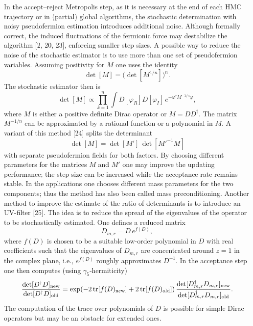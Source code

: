 In the accept--reject Metropolis step, as it is necessary at the end of each
HMC trajectory or in (partial) global algorithms, the stochastic determination
with noisy pseudofermion estimation introduces additional noise. Although
formally correct, the induced fluctuations of the fermionic force may
destabilize the algorithm [2, 20, 23], enforcing smaller step sizes.
A possible way to reduce the noise of the stochastic estimator is to use more
than one set of pseudofermion variables. Assuming positivity for $M$ one uses
the identity
\begin{equation}
\det[M] = \Big(\det[M^{1/n}]\Big)^n.
\end{equation}
The stochastic estimator then is
\begin{equation}
\det[M] \propto \prod_{k=1}^{n}\int D[\varphi_R]D[\varphi_I]\,e^{-\varphi^\dagger M^{-1/n}\varphi},
\end{equation}
where $M$ is either a positive definite Dirac operator or $M = DD^\dagger$. The
matrix $M^{-1/n}$ can be approximated by a rational function or a polynomial in
$M$.
A variant of this method [24] splits the determinant
\begin{equation}
\det[M] = \det[M']\,\det[M'^{-1}M]
\end{equation}
with separate pseudofermion fields for both factors. By choosing different
parameters for the matrices $M$ and $M'$ one may improve the updating
performance; the step size can be increased while the acceptance rate remains
stable. In the applications one chooses different mass parameters for the two
components; thus the method has also been called mass preconditioning.
Another method to improve the estimate of the ratio of determinants is to
introduce an UV-filter [25]. The idea is to reduce the spread of the
eigenvalues of the operator to be stochastically estimated. One defines a
reduced matrix
\begin{equation}
D_{m,r} = D\,e^{f(D)},
\end{equation}
where $f(D)$ is chosen to be a suitable low-order polynomial in $D$ with real
coefficients such that the eigenvalues of $D_{m,r}$ are concentrated around
$z = 1$ in the complex plane, i.e., $e^{f(D)}$ roughly approximates $D^{-1}$. In
the acceptance step one then computes (using $\gamma_5$-hermiticity)
\begin{equation}
\frac{\det[D^\dagger D]_{\mathrm{new}}}{\det[D^\dagger D]_{\mathrm{old}}}
= \exp(-2\operatorname{tr}[f(D)_{\mathrm{new}}] + 2\operatorname{tr}[f(D)_{\mathrm{old}}])\,
  \frac{\det[D_{m,r}^\dagger D_{m,r}]_{\mathrm{new}}}{\det[D_{m,r}^\dagger D_{m,r}]_{\mathrm{old}}}.
\end{equation}
The computation of the trace over polynomials of $D$ is possible for simple
Dirac operators but may be an obstacle for extended ones.

